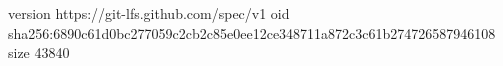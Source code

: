 version https://git-lfs.github.com/spec/v1
oid sha256:6890c61d0bc277059c2cb2c85e0ee12ce348711a872c3c61b274726587946108
size 43840
